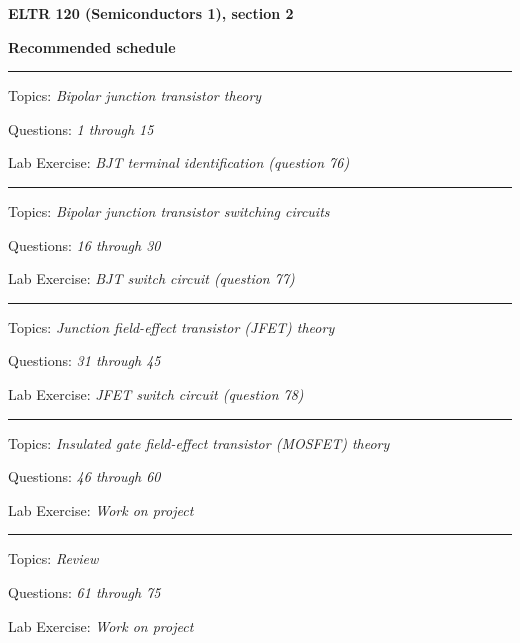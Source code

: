 
\centerline{\bf ELTR 120 (Semiconductors 1), section 2} \bigskip 
 
\vskip 10pt

\noindent
{\bf Recommended schedule}

\vskip 5pt

\hrule \vskip 5pt
\noindent
{}

\hskip 10pt Topics: {\it Bipolar junction transistor theory}
 
\hskip 10pt Questions: {\it 1 through 15}
 
\hskip 10pt Lab Exercise: {\it BJT terminal identification (question 76)}
 

\vskip 10pt
\hrule \vskip 5pt
\noindent
{}

\hskip 10pt Topics: {\it Bipolar junction transistor switching circuits}
 
\hskip 10pt Questions: {\it 16 through 30}
 
\hskip 10pt Lab Exercise: {\it BJT switch circuit (question 77)}
 
\vskip 10pt
\hrule \vskip 5pt
\noindent
{}

\hskip 10pt Topics: {\it Junction field-effect transistor (JFET) theory}
 
\hskip 10pt Questions: {\it 31 through 45}
 
\hskip 10pt Lab Exercise: {\it JFET switch circuit (question 78)}
 
\vskip 10pt
\hrule \vskip 5pt
\noindent
{}

\hskip 10pt Topics: {\it Insulated gate field-effect transistor (MOSFET) theory}
 
\hskip 10pt Questions: {\it 46 through 60}
 
\hskip 10pt Lab Exercise: {\it Work on project}
 

\vskip 10pt
\hrule \vskip 5pt
\noindent
{}

\hskip 10pt Topics: {\it Review}
 
\hskip 10pt Questions: {\it 61 through 75}
 
\hskip 10pt Lab Exercise: {\it Work on project}
 
